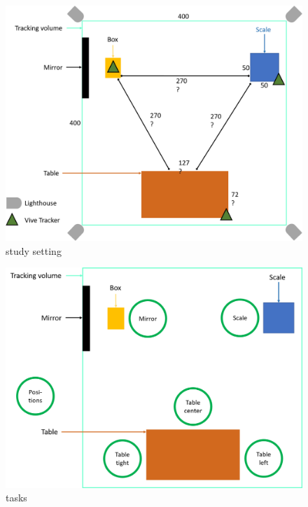 \begin{figure}[htb]
	\centering
	\includegraphics[width=\textwidth]{figures/study_setting.png}
	\caption[study setting]{study setting}
	\label{fig:study_setting}
\end{figure}

\begin{figure}[htb]
	\centering
	\includegraphics[width=\textwidth]{figures/learner_positions.png}
	\caption[Description of tasks]{tasks}
	\label{fig:learner_positions}
\end{figure}

